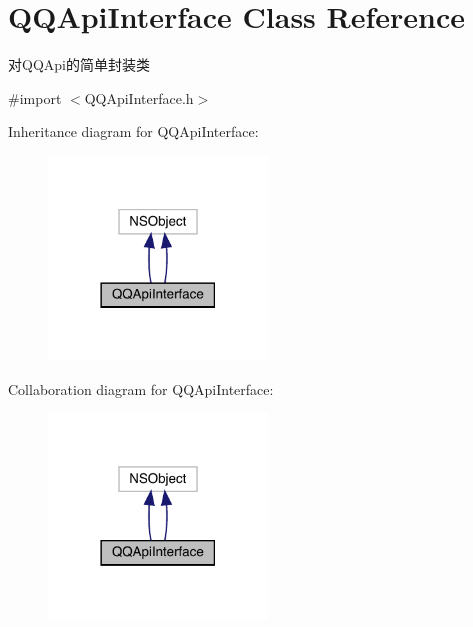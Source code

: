 \hypertarget{interface_q_q_api_interface}{}\section{Q\+Q\+Api\+Interface Class Reference}
\label{interface_q_q_api_interface}


对\+Q\+Q\+Api的简单封装类  




{\ttfamily \#import $<$Q\+Q\+Api\+Interface.\+h$>$}



Inheritance diagram for Q\+Q\+Api\+Interface\+:\nopagebreak
\begin{figure}[H]
\begin{center}
\leavevmode
\includegraphics[width=165pt]{interface_q_q_api_interface__inherit__graph}
\end{center}
\end{figure}


Collaboration diagram for Q\+Q\+Api\+Interface\+:\nopagebreak
\begin{figure}[H]
\begin{center}
\leavevmode
\includegraphics[width=165pt]{interface_q_q_api_interface__coll__graph}
\end{center}
\end{figure}
